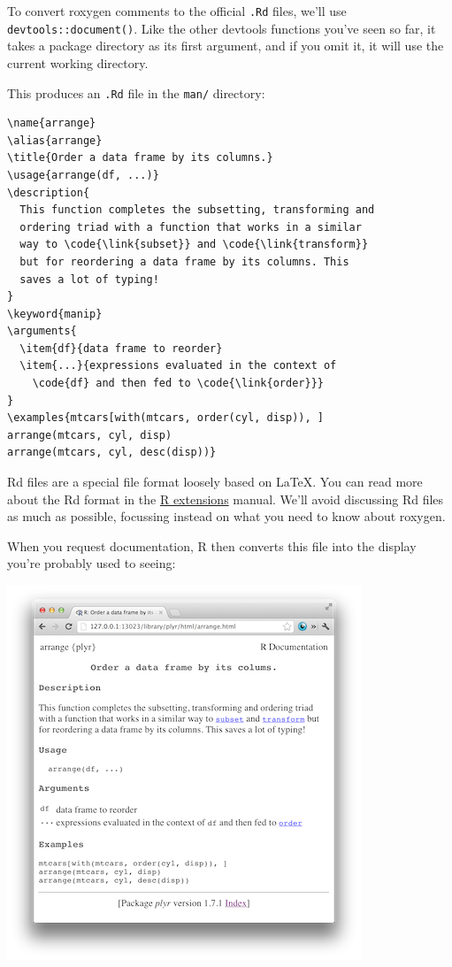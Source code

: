 To convert roxygen comments to the official \texttt{.Rd} files, we'll
use \texttt{devtools::document()}. Like the other devtools functions
you've seen so far, it takes a package directory as its first argument,
and if you omit it, it will use the current working directory.

This produces an \texttt{.Rd} file in the \texttt{man/} directory:

\begin{verbatim}
\name{arrange}
\alias{arrange}
\title{Order a data frame by its columns.}
\usage{arrange(df, ...)}
\description{
  This function completes the subsetting, transforming and
  ordering triad with a function that works in a similar
  way to \code{\link{subset}} and \code{\link{transform}}
  but for reordering a data frame by its columns. This
  saves a lot of typing!
}
\keyword{manip}
\arguments{
  \item{df}{data frame to reorder}
  \item{...}{expressions evaluated in the context of 
    \code{df} and then fed to \code{\link{order}}}
}
\examples{mtcars[with(mtcars, order(cyl, disp)), ]
arrange(mtcars, cyl, disp)
arrange(mtcars, cyl, desc(disp))}
\end{verbatim}

Rd files are a special file format loosely based on LaTeX. You can read
more about the Rd format in the
\href{http://cran.r-project.org/doc/manuals/R-exts.html\#Rd-format}{R
extensions} manual. We'll avoid discussing Rd files as much as possible,
focussing instead on what you need to know about roxygen.

When you request documentation, R then converts this file into the
display you're probably used to seeing:

\includegraphics{arrange-html.png}

